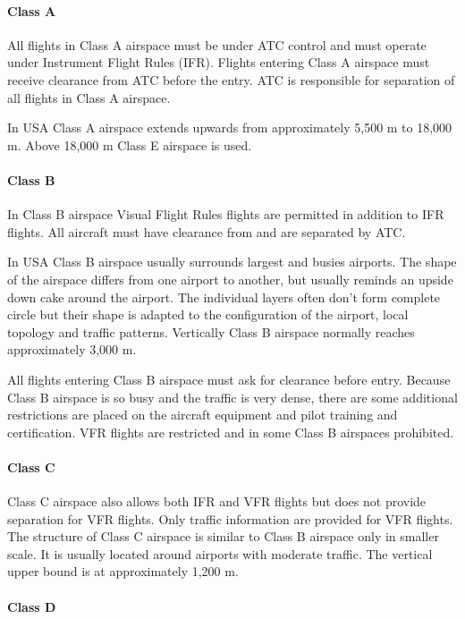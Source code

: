 \paragraph{Class A}

All flights in Class A airspace must be under ATC control and must operate under Instrument Flight Rules (IFR). Flights entering Class A airspace must receive clearance from ATC before the entry. ATC is responsible for separation of all flights in Class A airspace.

In USA Class A airspace extends upwards from approximately 5,500 m to 18,000 m. Above 18,000 m Class E airspace is used.

\paragraph{Class B}

In Class B airspace Visual Flight Rules flights are permitted in addition to IFR flights. All aircraft must have clearance from and are separated by ATC.

In USA Class B airspace usually surrounds largest and busies airports. The shape of the airspace differs from one airport to another, but usually reminds an upside down cake around the airport. The individual layers often don't form complete circle but their shape is adapted to the configuration of the airport, local topology and traffic patterns. Vertically Class B airspace normally reaches approximately 3,000 m. \cite[Chapter 3]{aim}

All flights entering Class B airspace must ask for clearance before entry. Because Class B airspace is so busy and the traffic is very dense, there are some additional restrictions are placed on the aircraft equipment and pilot training and certification. VFR flights are restricted and in some Class B airspaces prohibited.

\paragraph{Class C}

Class C airspace also allows both IFR and VFR flights but does not provide separation for VFR flights. Only traffic information are provided for VFR flights. The structure of Class C airspace is similar to Class B airspace only in smaller scale. It is usually located around airports with moderate traffic. The vertical upper bound is at  approximately 1,200 m.

\paragraph{Class D}

